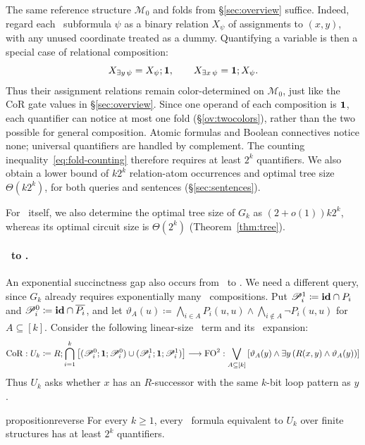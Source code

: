 The same reference structure $\mathcal M_0$ and folds from \S\ref{sec:overview} suffice.
Indeed, regard each \FOtwo\ subformula $\psi$ as a binary relation
$X_\psi$ of assignments to $(x,y)$, with any unused coordinate treated
as a dummy. Quantifying a variable is then a special case of relational
composition:
\[
  X_{\exists y\,\psi}=X_\psi;\mathbf{1},
  \qquad
  X_{\exists x\,\psi}=\mathbf{1};X_\psi.
\]
Thus their assignment relations remain color-determined on $\mathcal M_0$,
just like the CoR gate values in \S\ref{sec:overview}.
Since one operand of each composition is $\mathbf{1}$, each quantifier can
notice at most one fold (\S\ref{ov:twocolors}), rather than the two
possible for general composition. Atomic formulas and Boolean
connectives notice none; universal quantifiers are handled by
complement. The counting inequality~\eqref{eq:fold-counting} therefore
requires at least $2^k$ quantifiers. We also obtain a lower bound of $k2^k$ relation-atom occurrences and
optimal tree size $\Theta(k2^k)$, for both queries and sentences
(\S\ref{sec:sentences}).

For \CoR\ itself, we also determine the optimal tree size of $G_k$
as $(2+o(1))k2^k$, whereas its optimal circuit size is $\Theta(2^k)$
(Theorem~\ref{thm:tree}).

\paragraph{\texorpdfstring{{\boldmath\CoR\ to \FOtwo}}{CoR to FO2}.}
An exponential succinctness gap also occurs from \CoR\ to \FOtwo.
We need a different query, since $G_k$ already requires exponentially
many \CoR\ compositions. Put $\mathscr P_i^1\coloneqq\mathbf{id}\cap P_i$
and $\mathscr P_i^0\coloneqq\mathbf{id}\cap\overline{P_i}$, and let
$\vartheta_A(u)\coloneqq\bigwedge_{i\in A}P_i(u,u)\land
\bigwedge_{i\notin A}\neg P_i(u,u)$ for $A\subseteq[k]$.
Consider the following linear-size \CoR\ term and its \FOtwo\ expansion:
\[
\emph{\ensuremath{\mathrm{CoR}}}:
 U_k \coloneqq R;\bigcap_{i=1}^k
 \left[(\mathscr P_i^0;\mathbf{1};\mathscr P_i^0)
 \cup(\mathscr P_i^1;\mathbf{1};\mathscr P_i^1)\right]
 \longrightarrow
\emph{\ensuremath{\mathrm{FO}^{2}}}:
 \bigvee_{A\subseteq[k]}
 \left[\vartheta_A(y)\land\exists y\,
    (R(x,y)\land\vartheta_A(y))\right]
\]
Thus $U_k$ asks whether $x$ has an $R$-successor with the same
$k$-bit loop pattern as $y$.
\begin{restatable}{proposition}{reverse}\label{prop:reverse}
For every $k\ge1$, every \FOtwo\ formula equivalent to $U_k$
over finite structures has at least $2^k$ quantifiers.
\end{restatable}

